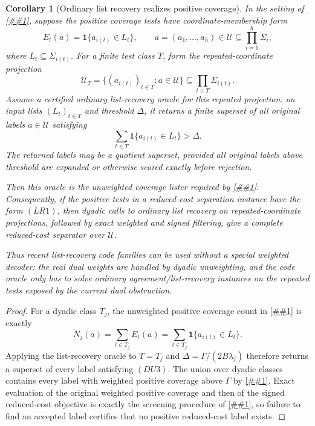 \documentclass[10pt]{article}
\newcommand{\cref}[1]{\ref{##1}}
\newtheorem{corollary}[theorem]{Corollary}
\theoremstyle{definition}
\begin{document}
\begin{corollary}[Ordinary list recovery realizes positive coverage]
   \label{cor:ordinary-list-recovery-positive-coverage}
   In the setting of \cref{cor:positive-coverage-screen}, suppose the positive
   coverage tests have coordinate-membership form
   \[
      E_t(a)=\mathbf 1\{a_{i(t)}\in L_t\},
      \qquad
      a=(a_1,\ldots,a_h)\in\mathcal U\subseteq\prod_{i=1}^h\Sigma_i ,
      \tag{LR1}
   \]
   where \(L_t\subseteq\Sigma_{i(t)}\).  For a finite test class
   \(T\), form the repeated-coordinate projection
   \[
      \mathcal U_T
      =
      \{(a_{i(t)})_{t\in T}:a\in\mathcal U\}
      \subseteq\prod_{t\in T}\Sigma_{i(t)} .
      \tag{LR2}
   \]
   Assume a certified ordinary list-recovery oracle for this repeated
   projection: on input lists \((L_t)_{t\in T}\) and threshold \(\Delta\), it
   returns a finite superset of all original labels \(a\in\mathcal U\)
   satisfying
   \[
      \sum_{t\in T}\mathbf 1\{a_{i(t)}\in L_t\}>\Delta .
      \tag{LR3}
   \]
   The returned labels may be a quotient superset, provided all original labels
   above threshold are expanded or otherwise scored exactly before rejection.

   Then this oracle is the unweighted coverage lister required by
   \cref{cor:dyadic-positive-list-recovery}.  Consequently, if the positive
   tests in a reduced-cost separation instance have the form \((LR1)\), then
   dyadic calls to ordinary list recovery on repeated-coordinate projections,
   followed by exact weighted and signed filtering, give a complete
   reduced-cost separator over \(\mathcal U\).

   Thus recent list-recovery code families can be used without a special
   weighted decoder: the real dual weights are handled by dyadic unweighting,
   and the code oracle only has to solve ordinary agreement/list-recovery
   instances on the repeated tests exposed by the current dual obstruction.
\end{corollary}

\begin{proof}
   For a dyadic class \(T_j\), the unweighted positive coverage count in
   \cref{cor:dyadic-positive-list-recovery} is exactly
   \[
      N_j(a)=\sum_{t\in T_j}E_t(a)
      =
      \sum_{t\in T_j}\mathbf 1\{a_{i(t)}\in L_t\}.
   \]
   Applying the list-recovery oracle to \(T=T_j\) and
   \(\Delta=\Gamma/(2B\lambda_j)\) therefore returns a superset of every label
   satisfying \((DU3)\).  The union over dyadic classes contains every label
   with weighted positive coverage above \(\Gamma\) by
   \cref{cor:dyadic-positive-list-recovery}.  Exact evaluation of the original
   weighted positive coverage and then of the signed reduced-cost objective is
   exactly the screening procedure of \cref{cor:positive-coverage-screen}, so
   failure to find an accepted label certifies that no positive reduced-cost
   label exists.
\end{proof}
\end{document}
